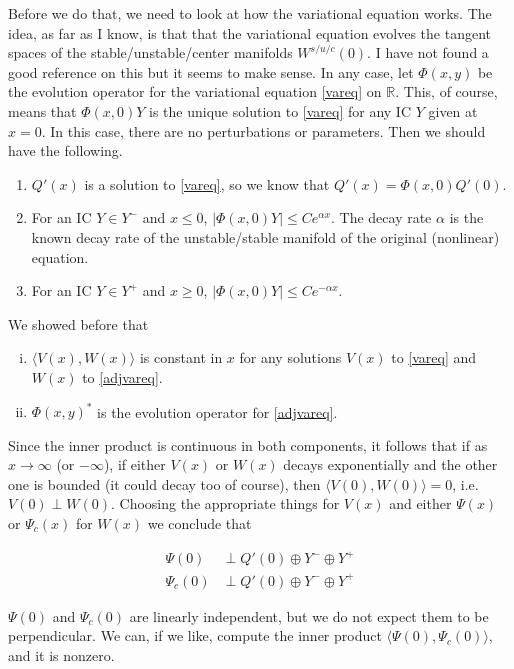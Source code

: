 \documentclass[12pt]{article}
\def\R{{\mathbb R}}
\begin{document}
Before we do that, we need to look at how the variational equation works. The idea, as far as I know, is that that the variational equation evolves the tangent spaces of the stable/unstable/center manifolds $W^{s/u/c}(0)$. I have not found a good reference on this but it seems to make sense. In any case, let $\Phi(x, y)$ be the evolution operator for the variational equation \eqref{vareq} on $\R$. This, of course, means that $\Phi(x, 0)Y$ is the unique solution to \eqref{vareq} for any IC $Y$ given at $x = 0$. In this case, there are no perturbations or parameters. Then we should have the following.

\begin{enumerate}
	\item $Q'(x)$ is a solution to \eqref{vareq}, so we know that $Q'(x) = \Phi(x, 0)Q'(0)$.
	\item For an IC $Y \in Y^-$ and $x \leq 0$, $|\Phi(x, 0) Y| \leq C e^{\alpha x}$. The decay rate $\alpha$ is the known decay rate of the unstable/stable manifold of the original (nonlinear) equation.
	\item For an IC $Y \in Y^+$ and $x \geq 0$, $|\Phi(x, 0) Y| \leq C e^{-\alpha x}$. 
\end{enumerate}

We showed before that

\begin{enumerate}[(i)]
\item $\langle V(x), W(x) \rangle$ is constant in $x$ for any solutions $V(x)$ to \eqref{vareq} and $W(x)$ to \eqref{adjvareq}.
\item $\Phi(x, y)^*$ is the evolution operator for \eqref{adjvareq}.
\end{enumerate}

Since the inner product is continuous in both components, it follows that if as $x \rightarrow \infty$ (or $-\infty$), if either $V(x)$ or $W(x)$ decays exponentially and the other one is bounded (it could decay too of course), then $\langle V(0), W(0) \rangle = 0$, i.e. $V(0) \perp W(0)$. Choosing the appropriate things for $V(x)$ and either $\Psi(x)$ or $\Psi_c(x)$ for $W(x)$ we conclude that

\begin{align*}
\Psi(0) &\perp Q'(0) \oplus Y^- \oplus Y^+ \\
\Psi_c(0) &\perp Q'(0) \oplus Y^- \oplus Y^+
\end{align*}

$\Psi(0)$ and $\Psi_c(0)$ are linearly independent, but we do not expect them to be perpendicular. We can, if we like, compute the inner product $\langle \Psi(0), \Psi_c(0) \rangle$, and it is nonzero.\\
\end{document}
